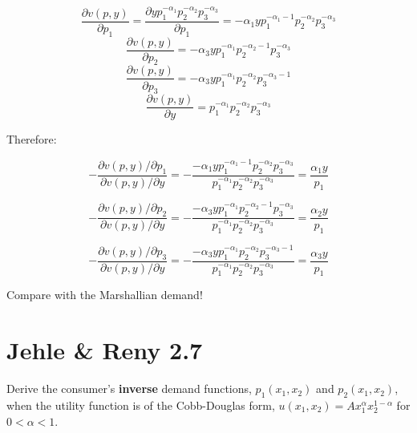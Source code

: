 \documentclass{article}
\begin{document}
$$\frac{\partial v(p,y)} {\partial p_1} = \frac{\partial yp_1^{-\alpha_1}p_2^{-\alpha_2}p_3^{-\alpha_3}}{\partial p_1} =  -\alpha_1 yp_1^{-\alpha_1 -1}p_2^{-\alpha_2}p_3^{-\alpha_3}$$
$$\frac{\partial v(p,y)} {\partial p_2} =  -\alpha_3 yp_1^{-\alpha_1}p_2^{-\alpha_2-1}p_3^{-\alpha_3}$$
$$\frac{\partial v(p,y)} {\partial p_3} =  -\alpha_3 yp_1^{-\alpha_1}p_2^{-\alpha_2}p_3^{-\alpha_3-1}$$
$$\frac{\partial v(p,y)} {\partial y} = p_1^{-\alpha_1}p_2^{-\alpha_2}p_3^{-\alpha_3}$$

Therefore:

$$-\frac{\partial v(p,y) / \partial p_1}{\partial v(p,y) / \partial y} =-\frac{-\alpha_1 yp_1^{-\alpha_1 -1}p_2^{-\alpha_2}p_3^{-\alpha_3}}{p_1^{-\alpha_1}p_2^{-\alpha_2}p_3^{-\alpha_3}} = \frac{\alpha_1 y}{p_1}$$

$$-\frac{\partial v(p,y) / \partial p_2}{\partial v(p,y) / \partial y} =-\frac{-\alpha_3 yp_1^{-\alpha_1}p_2^{-\alpha_2-1}p_3^{-\alpha_3}}{p_1^{-\alpha_1}p_2^{-\alpha_2}p_3^{-\alpha_3}} = \frac{\alpha_2 y}{p_1}$$

$$-\frac{\partial v(p,y) / \partial p_3}{\partial v(p,y) / \partial y} =-\frac{ -\alpha_3 yp_1^{-\alpha_1}p_2^{-\alpha_2}p_3^{-\alpha_3-1}}{p_1^{-\alpha_1}p_2^{-\alpha_2}p_3^{-\alpha_3}} = \frac{\alpha_3 y}{p_1}$$

Compare with the Marshallian demand!

\section{Jehle \& Reny 2.7}
Derive the consumer's \textbf{inverse} demand functions, $p_1(x_1, x_2)$ and $p_2(x_1, x_2)$, 
when the utility function is of the Cobb-Douglas form, $u(x_1, x_2) = Ax_1^{\alpha}x_2^{1-\alpha}$
for $0 < \alpha < 1$.
\end{document}
